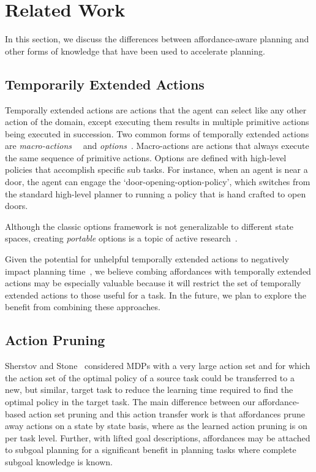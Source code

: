 \documentclass[letterpaper]{article}
\begin{document}
\section{Related Work}
\label{sec:related-work}

In this section, we discuss the differences between
affordance-aware planning and other forms of knowledge that
have been used to accelerate planning.

\subsection{Temporarily Extended Actions}
Temporally extended actions are actions that the agent can
select like any other action of the domain, except executing them
results in multiple primitive actions being executed in
succession. Two common forms of temporally extended actions are {\em
  macro-actions}~\cite{hauskrecht98} ~and {\em options}~\cite{sutton99}. 
Macro-actions are actions that always
execute the same sequence of primitive actions. Options are defined
with high-level policies that accomplish specific sub tasks. For
instance, when an agent is near a door, the agent can engage the
`door-opening-option-policy', which switches from the standard
high-level planner to running a policy that is hand crafted to open
doors. 

Although the classic options framework is not generalizable to different state spaces,
creating {\em portable} options is a topic of active research~\cite{konidaris07,konidaris2009efficient,Ravindran03analgebraic,croonenborghs2008learning,andre2002state,konidaris2012transfer}.

Given the potential for unhelpful temporally extended actions to negatively impact planning time~\cite{Jong:2008zr}, we believe combing affordances with temporally extended actions
may be especially valuable because it will restrict the set of temporally extended actions to those
useful for a task. In the future, we plan to explore the benefit from combining
these approaches.

\subsection{Action Pruning}

Sherstov and Stone~\cite{sherstov2005improving} considered MDPs with a very large action set and for which the action
set of the optimal policy of a source task could be transferred to a new, but similar, target
task to reduce the learning time required to find the optimal policy in the target task. The main difference between our affordance-based action set pruning and this action transfer
work is that affordances prune away actions on a state by state basis, where
as the learned action pruning is on per task level. Further, with lifted goal descriptions, affordances may be attached to subgoal planning for a significant
benefit in planning tasks where complete subgoal knowledge is known.
\end{document}
